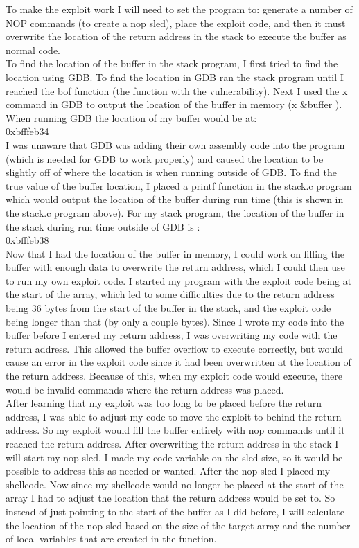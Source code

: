 \documentclass[14pt]{extarticle}
\begin{document}
To make the exploit work I will need to set the program to: generate a number of NOP commands (to create a nop sled), place the exploit code, and then it must overwrite the location of the return address in the stack to execute the buffer as normal code. \\
To find the location of the buffer in the stack program, I first tried to find the location using GDB. To find the location in GDB ran the stack program until I reached the bof function (the function with the vulnerability). Next I used the x command in GDB to output the location of the buffer in memory (x \&buffer ). When running GDB the location of my buffer would be at:\\
0xbfffeb34\\
I was unaware that GDB was adding their own assembly code into the program (which is needed for GDB to work properly) and caused the location to be slightly off of where the location is when running outside of GDB. To find the true value of the buffer location, I placed a printf function in the stack.c program which would output the location of the buffer during run time (this is shown in the stack.c program above).
For my stack program, the location of the buffer in the stack during run time outside of GDB is :\\
0xbfffeb38\\
Now that I had the location of the buffer in memory, I could work on filling the buffer with enough data to overwrite the return address, which I could then use to run my own exploit code.
I started my program with the exploit code being at the start of the array, which led to some difficulties due to the return address being 36 bytes from the start of the buffer in the stack, and the exploit code being longer than that (by only a couple bytes). Since I wrote my code into the buffer before I entered my return address, I was overwriting my code with the return address. This allowed the buffer overflow to execute correctly, but would cause an error in the exploit code since it had been overwritten at the location of the return address. Because of this, when my exploit code would execute, there would be invalid commands where the return address was placed.\\
After learning that my exploit was too long to be placed before the return address, I was able to adjust my code to move the exploit to behind the return address. So my exploit would fill the buffer entirely with nop commands until it reached the return address. After overwriting the return address in the stack I will start my nop sled. I made my code variable on the sled size, so it would be possible to address this as needed or wanted. After the nop sled I placed my shellcode. Now since my shellcode would no longer be placed at the start of the array I had to adjust the location that the return address would be set to. So instead of just pointing to the start of the buffer as I did before, I will calculate the location of the nop sled based on the size of the target array and the number of local variables that are created in the function. \\
\end{document}
